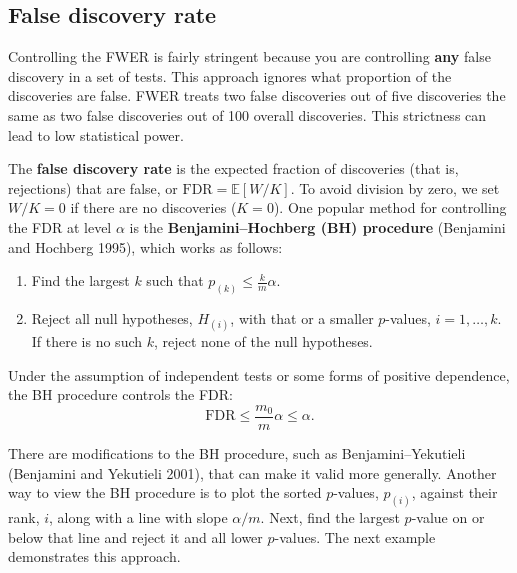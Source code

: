 \documentclass[
  13pt,
  letterpaper,
  DIV=11,
  numbers=noendperiod]{scrreprt}
\newcounter{none} %
\providecommand{\tightlist}{%
  \setlength{\itemsep}{0pt}\setlength{\parskip}{0pt}}
\newcommand{\E}{\mathbb{E}}
\theoremstyle{plain}
\theoremstyle{plain}
\theoremstyle{definition}
\theoremstyle{definition}
\theoremstyle{remark}
\begin{document}
\subsection{False discovery rate}\label{sec-fdr}

Controlling the FWER is fairly stringent because you are controlling
\textbf{any} false discovery in a set of tests. This approach ignores
what proportion of the discoveries are false. FWER treats two false
discoveries out of five discoveries the same as two false discoveries
out of 100 overall discoveries. This strictness can lead to low
statistical power.

The \textbf{false discovery rate} is the expected fraction of
discoveries (that is, rejections) that are false, or
\(\text{FDR} = \E[W/K]\). To avoid division by zero, we set \(W/K = 0\)
if there are no discoveries (\(K = 0\)). One popular method for
controlling the FDR at level \(\alpha\) is the
\textbf{Benjamini--Hochberg (BH) procedure} (Benjamini and Hochberg
1995), which works as follows:

\begin{enumerate}
\def\labelenumi{\arabic{enumi}.}
\tightlist
\item
  Find the largest \(k\) such that \(p_{(k)} \leq \frac{k}{m} \alpha\).
\item
  Reject all null hypotheses, \(H_{(i)}\), with that or a smaller
  \(p\)-values, \(i = 1, \ldots, k\). If there is no such \(k\), reject
  none of the null hypotheses.
\end{enumerate}

Under the assumption of independent tests or some forms of positive
dependence, the BH procedure controls the FDR: \[
\text{FDR} \leq \frac{m_0}{m}\alpha \leq \alpha.
\]

There are modifications to the BH procedure, such as
Benjamini--Yekutieli (Benjamini and Yekutieli 2001), that can make it
valid more generally. Another way to view the BH procedure is to plot
the sorted \(p\)-values, \(p_{(i)}\), against their rank, \(i\), along
with a line with slope \(\alpha/m\). Next, find the largest \(p\)-value
on or below that line and reject it and all lower \(p\)-values. The next
example demonstrates this approach.
\end{document}
